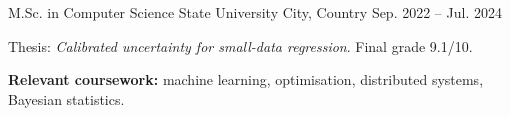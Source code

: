 \cventry
  {M.Sc. in Computer Science}                 %
  {State University}                          %
  {City, Country}                             %
  {Sep. 2022 -- Jul. 2024}                    %
  {
    \begin{cvitems}
      \item {Thesis: \textit{Calibrated uncertainty for small-data
      regression}. Final grade 9.1/10.}
      \item {\textbf{Relevant coursework:} machine learning, optimisation,
      distributed systems, Bayesian statistics.}
    \end{cvitems}
  }
